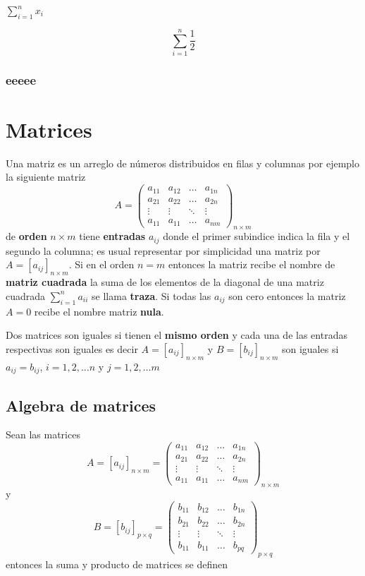\documentclass[
  11pt,
]{krantz}
\theoremstyle{definition}
\theoremstyle{definition}
\theoremstyle{definition}
\theoremstyle{definition}
\theoremstyle{remark}
\begin{document}
\(\sum_{i=1}^nx_i\)

\[
\sum_{i=1}^n \frac{1}{2}
\]

\hypertarget{eeeee}{%
\subsection{eeeee}\label{eeeee}}

\hypertarget{matrices}{%
\chapter{Matrices}\label{matrices}}

Una matriz es un arreglo de números distribuidos en filas y columnas por ejemplo la siguiente matriz
\[A=\begin{pmatrix}
a_{11}&a_{12}&\ldots&a_{1n}\\
a_{21}&a_{22}&\ldots&a_{2n}\\
\vdots & \vdots & \ddots &\vdots \\
a_{11}&a_{11}&\ldots&a_{nm}
\end{pmatrix}_{n\times m}\]
de \textbf{orden} \(n\times m\) tiene \textbf{entradas} \(a_{ij}\) donde el primer subindice indica la fila y el segundo la columna; es usual representar por simplicidad una matriz por \(A=[a_{ij}]_{n\times m}\). Si en el orden \(n=m\) entonces la matriz recibe el nombre de \textbf{matriz cuadrada} la suma de los elementos de la diagonal de una matriz cuadrada \(\sum_{i=1}^na_{ii}\) se llama \textbf{traza}. Si todas las \(a_{ij}\) son cero entonces la matriz \(A=0\) recibe el nombre matriz \textbf{nula}.

Dos matrices son iguales si tienen el \textbf{mismo orden} y cada una de las entradas respectivas son iguales es decir \(A=[a_{ij}]_{n\times m}\) y \(B=[b_{ij}]_{n\times m}\) son iguales si \(a_{ij}=b_{ij}\), \(i=1,2,\ldots n\) y \(j=1,2,\ldots m\)

\hypertarget{algebra-de-matrices}{%
\section{Algebra de matrices}\label{algebra-de-matrices}}

Sean las matrices \[A=[a_{ij}]_{n\times m}=\begin{pmatrix}
a_{11}&a_{12}&\ldots&a_{1n}\\
a_{21}&a_{22}&\ldots&a_{2n}\\
\vdots & \vdots & \ddots &\vdots \\
a_{11}&a_{11}&\ldots&a_{nm}
\end{pmatrix}_{n\times m}\] y \[B=[b_{ij}]_{p\times q}=\begin{pmatrix}
b_{11}&b_{12}&\ldots&b_{1n}\\
b_{21}&b_{22}&\ldots&b_{2n}\\
\vdots & \vdots & \ddots &\vdots \\
b_{11}&b_{11}&\ldots&b_{pq}
\end{pmatrix}_{p\times q}\] entonces la suma y producto de matrices se definen
\end{document}
